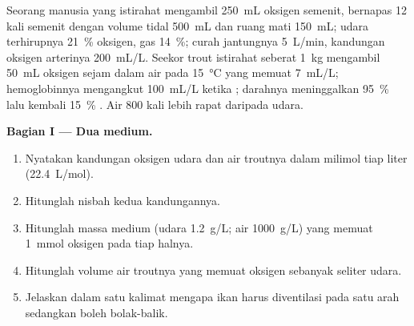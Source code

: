 \begin{problem}
\label{pb:b1:gas-exchange:1}
Seorang manusia yang istirahat mengambil \qty{250}{mL} oksigen semenit,
bernapas \qty{12}{} kali semenit dengan volume tidal \qty{500}{mL} dan
ruang mati \qty{150}{mL}; udara terhirupnya \qty{21}{\%} oksigen, gas
 \qty{14}{\%}; curah jantungnya \qty{5}{L/min}, kandungan
oksigen arterinya \qty{200}{mL/L}. Seekor trout istirahat seberat
\qty{1}{kg} mengambil \qty{50}{mL} oksigen sejam dalam air pada
\qty{15}{\celsius} yang memuat \qty{7}{mL/L}; hemoglobinnya mengangkut
\qty{100}{mL/L} ketika ; darahnya meninggalkan 
\qty{95}{\%}  lalu kembali \qty{15}{\%} . Air \qty{800}{}
kali lebih rapat daripada udara.

\medskip
\noindent\textbf{Bagian I --- Dua medium.}
\begin{enumerate}
  \item Nyatakan kandungan oksigen udara dan air troutnya dalam
        milimol tiap liter (\qty{22.4}{L/mol}).
  \item Hitunglah nisbah kedua kandungannya.
  \item Hitunglah massa medium (udara \qty{1.2}{g/L}; air
        \qty{1000}{g/L}) yang memuat \qty{1}{mmol} oksigen pada tiap
        halnya.
  \item Hitunglah volume air troutnya yang memuat oksigen sebanyak
        seliter udara.
  \item Jelaskan dalam satu kalimat mengapa  ikan harus
        diventilasi pada satu arah sedangkan  boleh
        bolak-balik.
\end{enumerate}


\end{problem}
